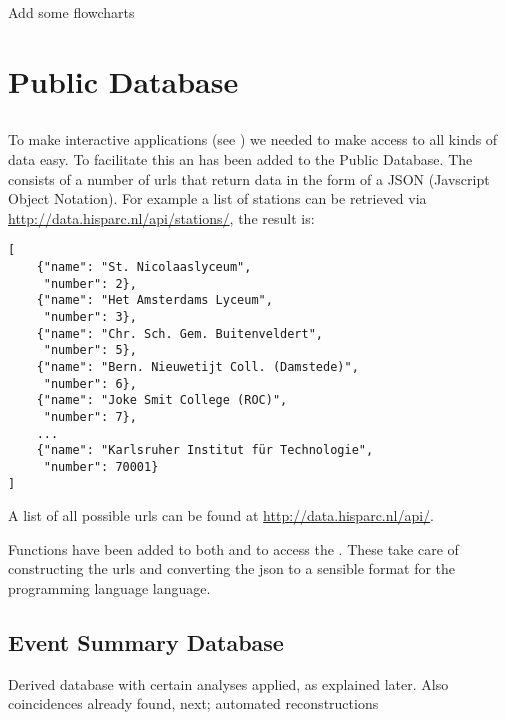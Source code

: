 Add some flowcharts


\section{\hisparc Public Database}

\subsection{\api}

To make interactive applications (see \jsparc) we needed to make
access to all kinds of data easy. To facilitate this an \api has been
added to the Public Database. The \api consists of a number of urls that
return data in the form of a JSON (Javscript Object Notation). For
example a list of \hisparc stations can be retrieved via
\url{http://data.hisparc.nl/api/stations/}, the result is:

\begin{verbatim}
[
    {"name": "St. Nicolaaslyceum",
     "number": 2},
    {"name": "Het Amsterdams Lyceum",
     "number": 3},
    {"name": "Chr. Sch. Gem. Buitenveldert",
     "number": 5},
    {"name": "Bern. Nieuwetijt Coll. (Damstede)",
     "number": 6},
    {"name": "Joke Smit College (ROC)",
     "number": 7},
    ...
    {"name": "Karlsruher Institut für Technologie",
     "number": 70001}
]
\end{verbatim}

A list of all possible urls can be found at \url{http://data.hisparc.nl/api/}.

Functions have been added to both \sapphire and \jsparc to access the
\api. These take care of constructing the urls and converting the json to a
sensible format for the programming language language.


\subsection{Event Summary Database}

Derived database with certain analyses applied, as explained later. Also
coincidences already found, next; automated reconstructions


\section{\sapphire}

\subsection{\pypi}

